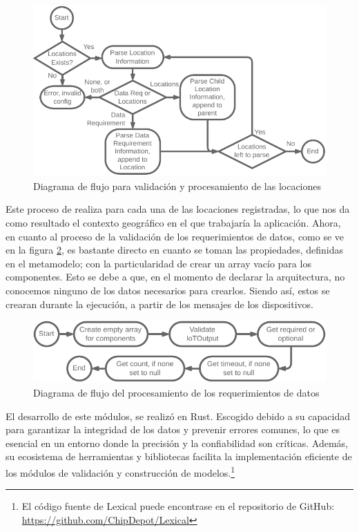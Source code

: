 \begin{figure}[ht]
    \centering
    \caption{Diagrama de flujo para validación y procesamiento de las locaciones}
    \label{fig:LexicalLocations}
    \includegraphics[width=\linewidth]{images/LexicalLocationsFlow.pdf}
\end{figure}


Este proceso de realiza para cada una de las locaciones registradas, lo que nos da como resultado el contexto geográfico en el que trabajaría la aplicación. Ahora, en cuanto al proceso de la validación de los requerimientos de datos, como se ve en la figura \ref{fig:LexicalDataReq}, es bastante directo en cuanto se toman las propiedades, definidas en el metamodelo; con la particularidad de crear un array vacío para los componentes. Esto se debe a que, en el momento de declarar la arquitectura, no conocemos ninguno de los datos necesarios para crearlos. Siendo así, estos se crearan durante la ejecución, a partir de los mensajes de los dispositivos.

\begin{figure}[ht]
    \centering
    \caption{Diagrama de flujo del procesamiento de los requerimientos de datos}
    \label{fig:LexicalDataReq}
    \includegraphics[width=0.9\linewidth]{images/LexicalDataRqeFlow.pdf}
\end{figure}

El desarrollo de este módulos, se realizó en Rust. Escogido debido a su capacidad para garantizar la integridad de los datos y prevenir errores comunes, lo que es esencial en un entorno donde la precisión y la confiabilidad son críticas. Además, su ecosistema de herramientas y bibliotecas facilita la implementación eficiente de los módulos de validación y construcción de modelos.\footnote{El código fuente de Lexical puede encontrase en el repositorio de GitHub: \url{https://github.com/ChipDepot/Lexical}}

